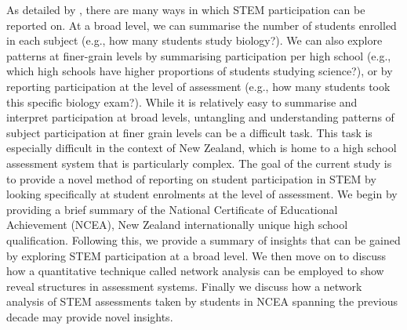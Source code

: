 As detailed by \citet{hipkins2005staying}, there are many ways in which STEM participation can be reported on. At a broad level, we can summarise the number of students enrolled in each subject (e.g., how many students study biology?). We can also explore patterns at finer-grain levels by summarising participation per high school (e.g., which high schools have higher proportions of students studying science?), or by reporting participation at the level of assessment (e.g., how many students took this specific biology exam?). While it is relatively easy to summarise and interpret participation at broad levels, untangling and understanding patterns of subject participation at finer grain levels can be a difficult task. This task is especially difficult in the context of New Zealand, which is home to a high school assessment system that is particularly complex. The goal of the current study is to provide a novel method of reporting on student participation in STEM by looking specifically at student enrolments at the level of assessment. We begin by providing a brief summary of the National Certificate of Educational Achievement (NCEA), New Zealand internationally unique high school qualification. Following this, we provide a summary of insights that can be gained by exploring STEM participation at a broad level. We then move on to discuss how a quantitative technique called network analysis can be employed to show reveal structures in assessment systems. Finally we discuss how a network analysis of STEM assessments taken by students in NCEA spanning the previous decade may provide novel insights. 

